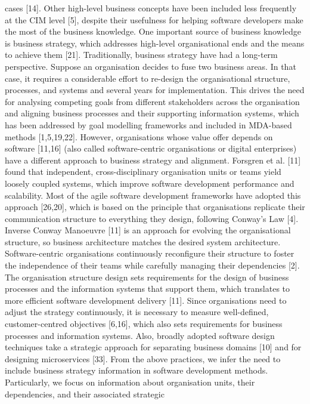 cases [14]. Other high-level business concepts have been included less frequently
at the CIM level [5], despite their usefulness for helping software developers make
the most of the business knowledge.
One important source of business knowledge is business strategy, which addresses high-level organisational ends and the means to achieve them [21]. Traditionally, business strategy have had a long-term perspective. Suppose an organisation decides to fuse two business areas. In that case, it requires a considerable
effort to re-design the organisational structure, processes, and systems and several years for implementation. This drives the need for analysing competing
goals from different stakeholders across the organisation and aligning business
processes and their supporting information systems, which has been addressed
by goal modelling frameworks and included in MDA-based methods [1,5,19,22].
However, organisations whose value offer depends on software [11,16] (also
called software-centric organisations or digital enterprises) have a different approach to business strategy and alignment. Forsgren et al. [11] found that independent, cross-disciplinary organisation units or teams yield loosely coupled
systems, which improve software development performance and scalability. Most
of the agile software development frameworks have adopted this approach [26,20],
which is based on the principle that organisations replicate their communication
structure to everything they design, following Conway’s Law [4]. Inverse Conway Manoeuvre [11] is an approach for evolving the organisational structure, so
business architecture matches the desired system architecture. Software-centric
organisations continuously reconfigure their structure to foster the independence
of their teams while carefully managing their dependencies [2]. The organisation
structure design sets requirements for the design of business processes and the
information systems that support them, which translates to more efficient software development delivery [11]. Since organisations need to adjust the strategy
continuously, it is necessary to measure well-defined, customer-centred objectives
[6,16], which also sets requirements for business processes and information systems. Also, broadly adopted software design techniques take a strategic approach
for separating business domains [10] and for designing microservices [33].
From the above practices, we infer the need to include business strategy information in software development methods. Particularly, we focus on information about organisation units, their dependencies, and their associated strategic
